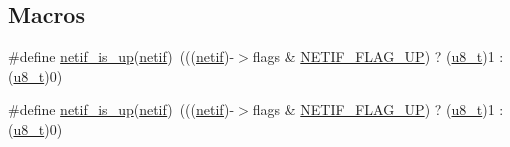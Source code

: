 \subsection*{Macros}
\begin{DoxyCompactItemize}
\item 
\#define \hyperlink{group__netif_ga94a4c24c988afc0a577387730f303b19}{netif\+\_\+is\+\_\+up}(\hyperlink{structnetif}{netif})~(((\hyperlink{structnetif}{netif})-\/$>$flags \& \hyperlink{group__netif__flags_gab47d7d130693dc155f480a5bf447725e}{N\+E\+T\+I\+F\+\_\+\+F\+L\+A\+G\+\_\+\+UP}) ? (\hyperlink{group__compiler__abstraction_ga4caecabca98b43919dd11be1c0d4cd8e}{u8\+\_\+t})1 \+: (\hyperlink{group__compiler__abstraction_ga4caecabca98b43919dd11be1c0d4cd8e}{u8\+\_\+t})0)
\item 
\#define \hyperlink{group__netif_ga94a4c24c988afc0a577387730f303b19}{netif\+\_\+is\+\_\+up}(\hyperlink{structnetif}{netif})~(((\hyperlink{structnetif}{netif})-\/$>$flags \& \hyperlink{group__netif__flags_gab47d7d130693dc155f480a5bf447725e}{N\+E\+T\+I\+F\+\_\+\+F\+L\+A\+G\+\_\+\+UP}) ? (\hyperlink{group__compiler__abstraction_ga4caecabca98b43919dd11be1c0d4cd8e}{u8\+\_\+t})1 \+: (\hyperlink{group__compiler__abstraction_ga4caecabca98b43919dd11be1c0d4cd8e}{u8\+\_\+t})0)
\end{DoxyCompactItemize}

